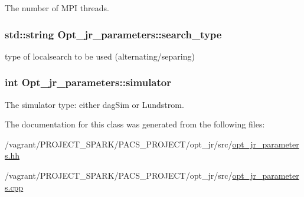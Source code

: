 The number of M\-P\-I threads. 

\hypertarget{classOpt__jr__parameters_a0826424385c08cba6aff3c04e6eee423}{
\subsubsection[{search\-\_\-type}]{\setlength{\rightskip}{0pt plus 5cm}std\-::string Opt\-\_\-jr\-\_\-parameters\-::search\-\_\-type\hspace{0.3cm}{\ttfamily [private]}}}\label{classOpt__jr__parameters_a0826424385c08cba6aff3c04e6eee423}


type of localsearch to be used (alternating/separing) 

\hypertarget{classOpt__jr__parameters_a032e1532dc68ecb39b2f2129c0d81449}{
\subsubsection[{simulator}]{\setlength{\rightskip}{0pt plus 5cm}int Opt\-\_\-jr\-\_\-parameters\-::simulator\hspace{0.3cm}{\ttfamily [private]}}}\label{classOpt__jr__parameters_a032e1532dc68ecb39b2f2129c0d81449}


The simulator type\-: either dag\-Sim or Lundstrom. 



The documentation for this class was generated from the following files\-:\begin{DoxyCompactItemize}
\item 
/vagrant/\-P\-R\-O\-J\-E\-C\-T\-\_\-\-S\-P\-A\-R\-K/\-P\-A\-C\-S\-\_\-\-P\-R\-O\-J\-E\-C\-T/opt\-\_\-jr/src/\hyperlink{opt__jr__parameters_8hh}{opt\-\_\-jr\-\_\-parameters.\-hh}\item 
/vagrant/\-P\-R\-O\-J\-E\-C\-T\-\_\-\-S\-P\-A\-R\-K/\-P\-A\-C\-S\-\_\-\-P\-R\-O\-J\-E\-C\-T/opt\-\_\-jr/src/\hyperlink{opt__jr__parameters_8cpp}{opt\-\_\-jr\-\_\-parameters.\-cpp}\end{DoxyCompactItemize}
